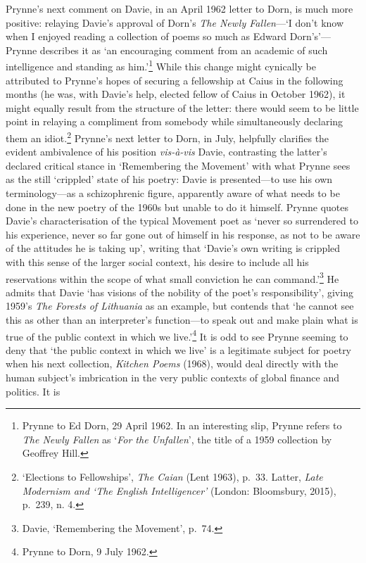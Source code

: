 \documentclass[]{article}
\begin{document}
Prynne’s next comment on Davie, in an April 1962 letter to Dorn, is much
more positive: relaying Davie’s approval of Dorn’s \emph{The Newly
Fallen}—‘I don’t know when I enjoyed reading a collection of poems so
much as Edward Dorn’s’—Prynne describes it as ‘an encouraging comment
from an academic of such intelligence and standing as him.’\footnote{Prynne
  to Ed Dorn, 29 April 1962. In an interesting slip, Prynne refers to
  \emph{The Newly Fallen} as ‘\emph{For the Unfallen}’, the title of a
  1959 collection by Geoffrey Hill.} While this change might cynically
be attributed to Prynne’s hopes of securing a fellowship at Caius in the
following months (he was, with Davie’s help, elected fellow of Caius in
October 1962), it might equally result from the structure of the letter:
there would seem to be little point in relaying a compliment from
somebody while simultaneously declaring them an idiot.\footnote{‘Elections
  to Fellowships’, \emph{The Caian} (Lent 1963), p.~33. Latter,
  \emph{Late Modernism and ‘The English Intelligencer’} (London:
  Bloomsbury, 2015), p.~239, n. 4.} Prynne’s next letter to Dorn, in
July, helpfully clarifies the evident ambivalence of his position
\emph{vis-à-vis} Davie, contrasting the latter’s declared critical
stance in ‘Remembering the Movement’ with what Prynne sees as the still
‘crippled’ state of his poetry: Davie is presented—to use his own
terminology—as a schizophrenic figure, apparently aware of what needs to
be done in the new poetry of the 1960s but unable to do it himself.
Prynne quotes Davie’s characterisation of the typical Movement poet as
‘never so surrendered to his experience, never so far gone out of
himself in his response, as not to be aware of the attitudes he is
taking up’, writing that ‘Davie’s own writing is crippled with this
sense of the larger social context, his desire to include all his
reservations within the scope of what small conviction he can
command.’\footnote{Davie, ‘Remembering the Movement’, p.~74.} He admits
that Davie ‘has visions of the nobility of the poet’s responsibility’,
giving 1959’s \emph{The Forests of Lithuania} as an example, but
contends that ‘he cannot see this as other than an interpreter’s
function—to speak out and make plain what is true of the public context
in which we live.’\footnote{Prynne to Dorn, 9 July 1962.} It is odd to
see Prynne seeming to deny that ‘the public context in which we live’ is
a legitimate subject for poetry when his next collection, \emph{Kitchen
Poems} (1968), would deal directly with the human subject’s imbrication
in the very public contexts of global finance and politics. It is
\end{document}
